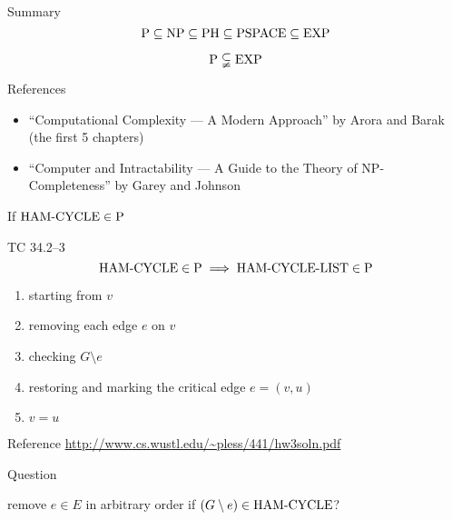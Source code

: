 \begin{frame}{Summary}
  \[
	\text{P} \subseteq \text{NP} \subseteq \text{PH} \subseteq \text{PSPACE} \subseteq \text{EXP}
  \]

  \[
	\text{P} \subsetneqq \text{EXP}
  \]

  \begin{alertblock}{References}
	\begin{itemize}
	  \item ``Computational Complexity --- A Modern Approach'' by Arora and Barak {\footnotesize (the first 5 chapters)}
	  \item ``Computer and Intractability --- A Guide to the Theory of NP-Completeness'' by Garey and Johnson
	\end{itemize}
  \end{alertblock}
\end{frame}  
\begin{frame}{If $\text{HAM-CYCLE} \in \text{P}$}
  \begin{exampleblock}{TC 34.2--3}
    \[
	  \text{HAM-CYCLE} \in \text{P} \implies \text{HAM-CYCLE}\text{-LIST} \in \text{P}
	\]
  \end{exampleblock}

  \begin{enumerate}
	\item starting from $v$
	\item removing each edge $e$ on $v$
	\item checking $G \setminus e$
	\item restoring and marking the critical edge $e = (v, u)$
	\item $v = u$
  \end{enumerate}

  \begin{alertblock}{Reference}
	\url{http://www.cs.wustl.edu/~pless/441/hw3soln.pdf}
  \end{alertblock}

  \begin{alertblock}{Question}
	\centerline{remove $e \in E$ in arbitrary order if $(G \setminus e) \in \text{HAM-CYCLE}$?}
  \end{alertblock}
\end{frame}
